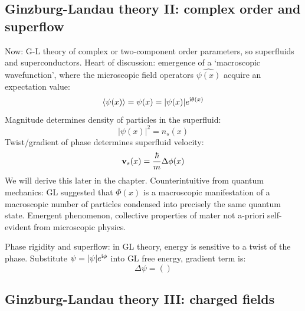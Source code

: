 \documentclass[../main.tex]{subfiles}
\begin{document}

\subsection{Ginzburg-Landau theory II: complex order and superflow}

Now: G-L theory of complex or two-component order parameters, so superfluids and superconductors.
Heart of discussion: emergence of a `macroscopic wavefunction', where the microscopic field operators \(\hat{\psi(x)}\) acquire an expectation value:
\begin{equation}
    \braket{\psi (x)} = \psi (x) = \vert \psi (x) \vert e^{\mathrm{i} \theta(x)}
\end{equation}
Magnitude determines density of particles in the superfluid:
\begin{equation}
    \vert \psi(x) \vert^2 = n_s (x)
\end{equation}
Twist/gradient of phase determines superfluid velocity:
\begin{equation}
    \bm{\mathrm{v}}_s (x) = \frac{\hbar}{m} \Delta \phi (x)
\end{equation}
We will derive this later in the chapter.
Counterintuitive from quantum mechanics: GL suggested that \(\Phi(x)\) is a macroscopic manifestation of a macroscopic number of particles condensed into precisely the same quantum state.
Emergent phenomenon, collective properties of mater not a-priori self-evident from microscopic physics.



Phase rigidity and superflow: in GL theory, energy is sensitive to a twist of the phase.
Substitute \(\psi = \vert \psi \vert e^{\mathrm{i} \phi}\) into GL free energy, gradient term is:
\begin{equation}
    \Delta \psi = ()
\end{equation}


\subsection{Ginzburg-Landau theory III: charged fields}

\end{document}
